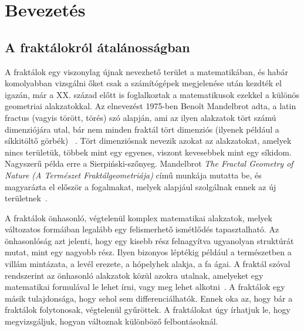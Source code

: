 \chapter{Bevezetés}

\section{A fraktálokról átalánosságban}
A fraktálok egy viszonylag újnak nevezhető terület a matematikában, és habár komolyabban vizsgálni őket csak a számítógépek megjelenése után kezdték el igazán, már a XX. század előtt is foglalkoztak a matematikusok ezekkel a különös geometriai alakzatokkal. Az elnevezést 1975-ben Benoît Mandelbrot adta, a latin fractus (vagyis törött, törés) szó alapján, ami az ilyen alakzatok tört számú dimenziójára utal, bár nem minden fraktál tört dimenziós (ilyenek például a síkkitöltő görbék)~\cite{fraktal} . 
Tört dimenziósnak nevezik azokat az alakzatokat, amelyek nincs területük, többek mint egy egyenes, viszont kevesebbek mint egy síkidom. Nagyszerű példa erre a Sierpiński-szőnyeg. Mandelbrot {\it The Fractal Geometry of Nature (A Természet Fraktálgeometriája)} című munkája mutatta be, és magyarázta el először a fogalmakat, melyek alapjául szolgálnak ennek az új területnek~\cite{fraktal-wiki}. 
\par A fraktálok önhasonló, végtelenül komplex matematikai alakzatok, melyek változatos formáiban legalább egy felismerhető ismétlődés tapasztalható. Az önhasonlóság azt jelenti, hogy egy kisebb rész felnagyítva ugyanolyan struktúrát mutat, mint egy nagyobb rész. Ilyen bizonyos léptékig például a természetben a villám mintázata, a levél erezete, a hópelyhek alakja, a fa ágai. A fraktál szóval rendszerint az önhasonló alakzatok közül azokra utalnak, amelyeket egy matematikai formulával le lehet írni, vagy meg lehet alkotni~\cite{fraktal}. A fraktálok egy másik tulajdonsága, hogy sehol sem differenciálhatók. Ennek oka az, hogy bár a fraktálok folytonosak, végtelenül gyűröttek. A fraktálokat úgy írhatjuk le, hogy megvizsgáljuk, hogyan változnak különböző felbontásoknál.

